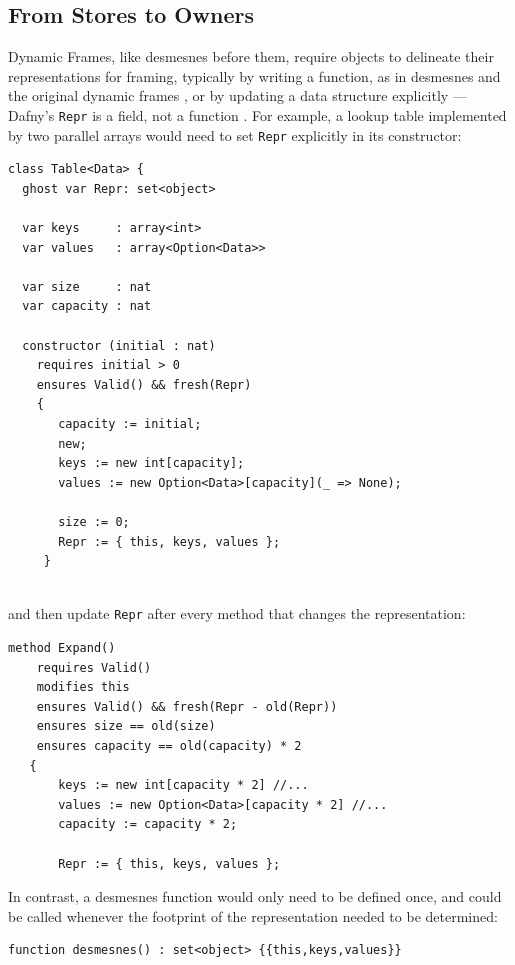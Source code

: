 \subsection{From Stores to Owners}

Dynamic Frames, like desmesnes before them, require objects to
delineate their representations for framing, typically by writing a
function, as in desmesnes \cite{wills91} and the original dynamic frames
\cite{dynamic-frames-fm2006}, or by updating a data structure
explicitly --- Dafny's \lstinline+Repr+ is a field, not a function
\cite{dafny-automatic-lpar2010,dafny-using-laser2011,dafny2023}.
For example, a lookup table implemented by two parallel arrays
would need to set \lstinline+Repr+ explicitly in its constructor:

\begin{lstlisting}
class Table<Data> {
  ghost var Repr: set<object>

  var keys     : array<int>
  var values   : array<Option<Data>>

  var size     : nat
  var capacity : nat
    
  constructor (initial : nat)
    requires initial > 0
    ensures Valid() && fresh(Repr)
    {   
       capacity := initial;
       new;
       keys := new int[capacity];
       values := new Option<Data>[capacity](_ => None);

       size := 0;
       Repr := { this, keys, values };
     }
 
\end{lstlisting}


\noindent and then update \lstinline+Repr+
after every method that changes the representation:

\begin{lstlisting}
method Expand()
    requires Valid()
    modifies this
    ensures Valid() && fresh(Repr - old(Repr))
    ensures size == old(size)
    ensures capacity == old(capacity) * 2
   {
       keys := new int[capacity * 2] //...
       values := new Option<Data>[capacity * 2] //...
       capacity := capacity * 2;

       Repr := { this, keys, values }; 
\end{lstlisting}


\noindent In contrast, a desmesnes function would only need to be
defined once, and could be called whenever the footprint of the
representation needed to be determined:

\begin{lstlisting}
function desmesnes() : set<object> {{this,keys,values}} 
\end{lstlisting}


